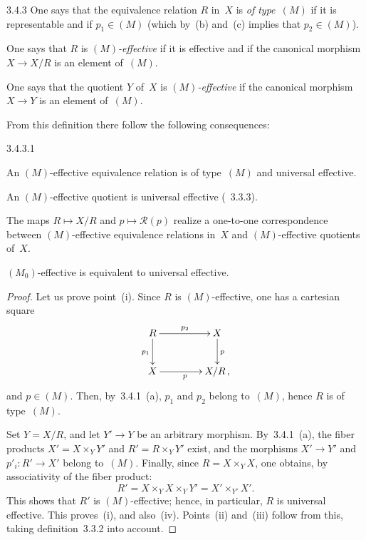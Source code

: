 \begin{definition}{3.4.3}
\label{IV.3.4.3}
One says that the equivalence relation \(R\) in~\(X\) is \emph{of type~\((M)\)}
if it is representable and if \(p_{1}\in(M)\) (which by~(b) and~(c) implies
that \(p_{2}\in(M)\)).

One says that \(R\) is \emph{\((M)\)-effective} if it is effective and if the
canonical morphism \(X\to X/R\) is an element of~\((M)\).

One says that the quotient \(Y\) of~\(X\) is \emph{\((M)\)-effective} if the
canonical morphism \(X\to Y\) is an element of~\((M)\).
\end{definition}

From this definition there follow the following consequences:%
{\renewcommand{\thefootnote}{(15)}}

\begin{proposition}{3.4.3.1}
\label{IV.3.4.3.1}
\begin{enumeratei}
\item An \((M)\)-effective equivalence relation is of type~\((M)\) and
universal effective.
\item An \((M)\)-effective quotient is universal effective (\cf~3.3.3).
\item The maps \(R\mapsto X/R\) and \(p\mapsto\mathcal{R}(p)\) realize a
one-to-one correspondence between \((M)\)-effective equivalence relations
in~\(X\) and \((M)\)-effective quotients of~\(X\).
\item \((M_{0})\)-effective is equivalent to universal effective.
\end{enumeratei}
\end{proposition}

\begin{proof}
Let us prove point~(i). Since \(R\) is \((M)\)-effective, one has a cartesian
square
\[
\xymatrix@C=4.2em@R=2.4em{
R \ar[r]^{p_{2}} \ar[d]_{p_{1}}
  & X \ar[d]^{p} \\
X \ar[r]_{p}
  & X/R\,,
}
\]
and \(p\in(M)\). Then, by~3.4.1~(a), \(p_{1}\) and \(p_{2}\) belong
to~\((M)\), hence \(R\) is of type~\((M)\).

Set \(Y=X/R\), and let \(Y'\to Y\) be an arbitrary morphism. By~3.4.1~(a),
the fiber products \(X'=X\times_{Y}Y'\) and \(R'=R\times_{Y}Y'\) exist, and
the morphisms \(X'\to Y'\) and \(p'_{i}\colon R'\to X'\) belong to~\((M)\).
Finally, since \(R=X\times_{Y}X\), one obtains, by associativity of the
fiber product:
\[
R'=X\times_{Y}X\times_{Y}Y'=X'\times_{Y'}X'.
\]
This shows that \(R'\) is \((M)\)-effective; hence, in particular, \(R\) is
universal effective. This proves~(i), and also~(iv). Points~(ii) and~(iii)
follow from this, taking definition~3.3.2 into account.
\end{proof}

